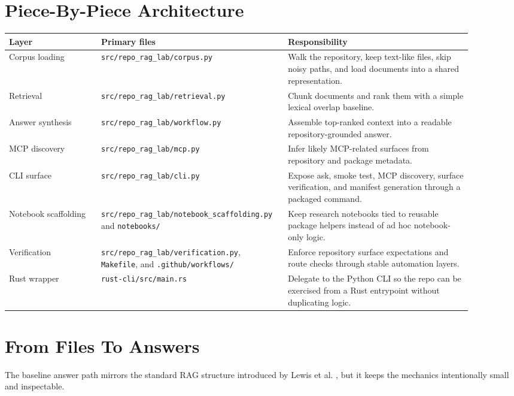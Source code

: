 \documentclass[11pt]{article}
\begin{document}
\section{Piece-By-Piece Architecture}

\begin{longtable}{>{\raggedright\arraybackslash}p{0.19\linewidth} >{\raggedright\arraybackslash}p{0.33\linewidth} >{\raggedright\arraybackslash}p{0.38\linewidth}}
\toprule
Layer & Primary files & Responsibility \\
\midrule
Corpus loading & \texttt{src/repo\_rag\_lab/corpus.py} & Walk the repository, keep text-like files, skip noisy paths, and load documents into a shared representation. \\
Retrieval & \texttt{src/repo\_rag\_lab/retrieval.py} & Chunk documents and rank them with a simple lexical overlap baseline. \\
Answer synthesis & \texttt{src/repo\_rag\_lab/workflow.py} & Assemble top-ranked context into a readable repository-grounded answer. \\
MCP discovery & \texttt{src/repo\_rag\_lab/mcp.py} & Infer likely MCP-related surfaces from repository and package metadata. \\
CLI surface & \texttt{src/repo\_rag\_lab/cli.py} & Expose ask, smoke test, MCP discovery, surface verification, and manifest generation through a packaged command. \\
Notebook scaffolding & \texttt{src/repo\_rag\_lab/notebook\_scaffolding.py} and \texttt{notebooks/} & Keep research notebooks tied to reusable package helpers instead of ad hoc notebook-only logic. \\
Verification & \texttt{src/repo\_rag\_lab/verification.py}, \texttt{Makefile}, and \texttt{.github/workflows/} & Enforce repository surface expectations and route checks through stable automation layers. \\
Rust wrapper & \texttt{rust-cli/src/main.rs} & Delegate to the Python CLI so the repo can be exercised from a Rust entrypoint without duplicating logic. \\
\bottomrule
\end{longtable}

\section{From Files To Answers}

The baseline answer path mirrors the standard RAG structure introduced by Lewis et al.
\cite{lewis2020rag}, but it keeps the mechanics intentionally small and inspectable.
\end{document}
